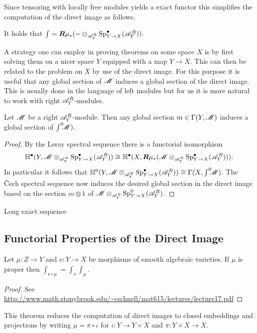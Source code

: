     Since tensoring with locally free modules yields a exact functor this simplifies the computation of the direct image as follows.
    \begin{corollary}
        It holds that $\int = \boldsymbol{R}\mu_* ({-}\otimes_{\mathscr{A}_Y^R} \operatorname{Sp}_{Y\to X}^\bullet(\mathscr{A}_Y^R))$.
    \end{corollary}
    A strategy one can employ in proving theorems on some space $X$ is by first solving them on a nicer space $Y$ equipped with a map $Y\to X$. This can then be related to the problem on $X$ by use of the direct image. For this purpose it is useful that any global section of $\mathscr{M}$ induces a global section of the direct image. This is usually done in the language of left modules but for us it is more natural to work with right $\mathscr{A}_Y^R$-modules.
    \begin{lemma}\label{lem: GlobalSectionDirectImage}
        Let $\mathscr{M}$ be a right $\mathscr{A}_Y^R$-module. Then any global section $m\in\Gamma(Y,\mathscr{M})$ induces a global section of $\int^0 \mkern -8mu\mathscr{M})$.
    \end{lemma}
    \begin{proof}
      By the Leray spectral sequence there is a functorial isomorphism
      $$\mathbb{H}^\bullet(Y,\mathscr{M}\otimes_{\mathscr{A}_Y^R} \operatorname{Sp}_{Y\to X}^\bullet(\mathscr{A}_Y^R)) \cong \mathbb{H}^\bullet(X,\boldsymbol{R}\mu_*(\mathscr{M}\otimes_{\mathscr{A}_Y^R} \operatorname{Sp}_{Y\to X}^\bullet(\mathscr{A}_Y^R))).$$
      In particular it follows that $\mathbb{H}^0(Y,\mathscr{M} \otimes_{\mathscr{A}_Y^R} \operatorname{Sp}_{Y\to X}^\bullet(\mathscr{A}_Y^R)) \cong \Gamma(X,\int^0 \mkern -8mu\mathscr{M})$. The \v Cech spectral sequence now induces the desired global section in the direct image based on the section $m\otimes 1$ of $\mathscr{M} \otimes_{\mathscr{A}_Y^R}\operatorname{Sp}_{Y\to X}^0(\mathscr{A}_Y^R)$.
    \end{proof}
    \begin{theorem}
      Long exact sequence
    \end{theorem}
    \subsection{Functorial Properties of the Direct Image}
    \begin{theorem}
       Let $\mu:Z\to Y$ and $\nu:Y\to X$ be morphisms of smooth algebraic varieties. If $\mu$ is proper then $\int_{\nu\circ \mu} = \int_\nu \int_\mu$.
    \end{theorem}
    \begin{proof}
      See \url{http://www.math.stonybrook.edu/~cschnell/mat615/lectures/lecture17.pdf}
    \end{proof}
    This theorem reduces the computation of direct images to closed embeddings and projections by writing $\mu = \pi \circ \iota$ for $\iota:Y\to Y\times X$ and $\pi:Y\times X\to X$.



